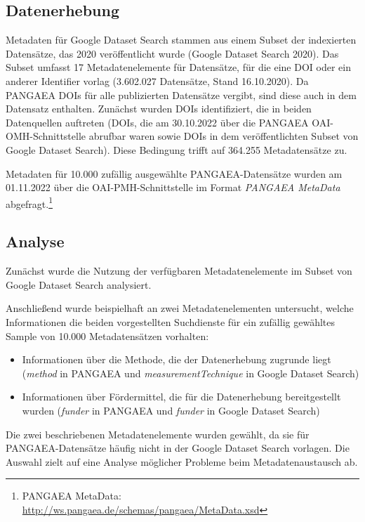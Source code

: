\documentclass[a4paper,
fontsize=11pt,
oneside,
numbers=noperiodatend,
parskip=half-,
bibliography=totoc,
final
]{scrartcl}
\begin{document}
\hypertarget{datenerhebung}{%
\subsection{Datenerhebung}\label{datenerhebung}}

Metadaten für Google Dataset Search stammen aus einem Subset der
indexierten Datensätze, das 2020 veröffentlicht wurde (Google Dataset
Search 2020). Das Subset umfasst 17 Metadatenelemente für Datensätze,
für die eine DOI oder ein anderer Identifier vorlag (3.602.027
Datensätze, Stand 16.10.2020). Da PANGAEA DOIs für alle publizierten
Datensätze vergibt, sind diese auch in dem Datensatz enthalten. Zunächst
wurden DOIs identifiziert, die in beiden Datenquellen auftreten (DOIs,
die am 30.10.2022 über die PANGAEA OAI-OMH-Schnittstelle abrufbar waren
sowie DOIs in dem veröffentlichten Subset von Google Dataset Search).
Diese Bedingung trifft auf 364.255 Metadatensätze zu.

Metadaten für 10.000 zufällig ausgewählte PANGAEA-Datensätze wurden am
01.11.2022 über die OAI-PMH-Schnittstelle im Format \emph{PANGAEA
MetaData} abgefragt.\footnote{PANGAEA MetaData:
  \url{http://ws.pangaea.de/schemas/pangaea/MetaData.xsd}}

\hypertarget{analyse}{%
\subsection{Analyse}\label{analyse}}

Zunächst wurde die Nutzung der verfügbaren Metadatenelemente im Subset
von Google Dataset Search analysiert.

Anschließend wurde beispielhaft an zwei Metadatenelementen untersucht,
welche Informationen die beiden vorgestellten Suchdienste für ein
zufällig gewähltes Sample von 10.000 Metadatensätzen vorhalten:

\begin{itemize}
\item
  Informationen über die Methode, die der Datenerhebung zugrunde liegt
  (\emph{method} in PANGAEA und \emph{measurementTechnique} in Google
  Dataset Search)
\item
  Informationen über Fördermittel, die für die Datenerhebung
  bereitgestellt wurden (\emph{funder} in PANGAEA und \emph{funder} in
  Google Dataset Search)
\end{itemize}

Die zwei beschriebenen Metadatenelemente wurden gewählt, da sie für
PANGAEA-Datensätze häufig nicht in der Google Dataset Search vorlagen.
Die Auswahl zielt auf eine Analyse möglicher Probleme beim
Metadatenaustausch ab.
\end{document}
